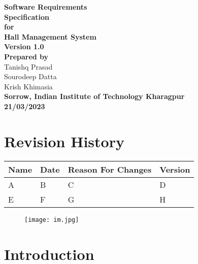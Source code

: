 \documentclass[letterpaper,12pt]{article}
\begin{document}
\vspace*{\fill}
\begin{flushright}
    \textbf{
        \Huge{Software Requirements \\ Specification} \\ \vspace{30pt} 
        \LARGE{for} \\ \vspace{30pt}
        \Huge{Hall Management System} \\ \vspace{30pt}
        \Large{Version 1.0} \\ \vspace{30pt}
        \Large{Prepared by}
    } \\ \vspace{10pt}
    \large{Tanishq Prasad \\ Sourodeep Datta \\ Krish Khimasia} \\ \vspace{30pt}
    \textbf{
        \Large{Sorrow, Indian Institute of Technology Kharagpur} \\ \vspace{30pt}
        \large{21/03/2023}
    }
\end{flushright}
\vspace*{\fill}
\pagebreak

\renewcommand*\contentsname{\Huge Table of Contents}
\small\tableofcontents
\pagebreak

\section*{\LARGE Revision History}
    \begin{center}
        \begin{tabular}{| p{2cm} | p{2cm} | p{5cm} | p{2cm} |}
            \hline			
            \textbf{Name} & \textbf{Date} & \textbf{Reason For Changes} & \textbf{Version} \\
            \hline \hline
            A & B & C & D \\
            \hline
            E & F & G & H \\
            \hline
        \end{tabular}
    \end{center}
\begin{figure}
    \centering
    \texttt{[image: im.jpg]}
\end{figure}
\section{\LARGE Introduction}
\end{document}
